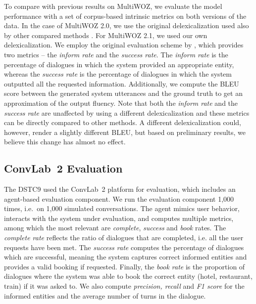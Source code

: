 \documentclass[letterpaper]{article} %
\begin{document}
To compare with previous results on MultiWOZ, we evaluate the model performance with a set of corpus-based intrinsic metrics on both versions of the data.
In the case of MultiWOZ 2.0, we use the original delexicalization used also by other compared methods \cite{peng2020,hosseini2020,zhang2019}. For MultiWOZ 2.1, we used our own delexicalization.
We employ the original evaluation scheme by \citet{budzianowski2018}, which provides two metrics -- the \emph{inform rate} and the \emph{success rate}. The \emph{inform rate} is the percentage of dialogues in which the system provided an appropriate entity, whereas the \emph{success rate} is the percentage of dialogues in which the system outputted all the requested information. Additionally, we compute the BLEU score \cite{papineni2002} between the generated system utterances and the ground truth to get an approximation of the output fluency.
Note that both the \emph{inform rate} and the \emph{success rate} are unaffected by using a different delexicalization and these metrics can be directly compared to other methods. A different delexicalization could, however, render a slightly different BLEU, but based on preliminary results, we believe this change has almost no effect.


\subsection{ConvLab~2 Evaluation}

The DSTC9 used the ConvLab~2 platform \cite{zhu2020} for evaluation, which includes an agent-based evaluation component.
We run the evaluation component 1,000 times, i.e.\ on 1,000 simulated conversations.
The agent mimics user behavior, interacts with the system under evaluation, and computes multiple metrics, among which the most relevant are \emph{complete}, \emph{success} and \emph{book} rates.
The \emph{complete rate} reflects the ratio of dialogues that are completed, i.e. all the user requests have been met.
The \emph{success rate} computes the percentage of dialogues which are successful, meaning the system captures correct informed entities and provides a valid booking if requested.
Finally, the \emph{book rate} is the proportion of dialogues where the system was able to book the correct entity (hotel, restaurant, train) if it was asked to.
We also compute \emph{precision, recall} and \emph{F1 score} for the informed entities and the average number of turns in the dialogue.
\end{document}
